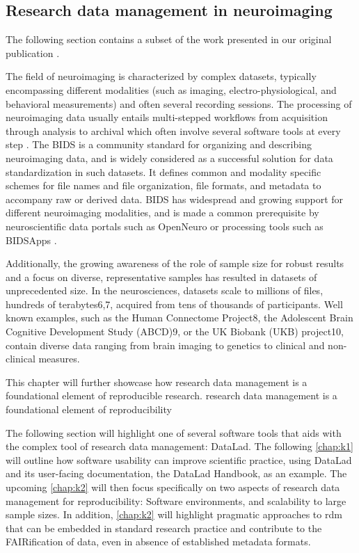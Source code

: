 \subsection{Research data management in neuroimaging}
\label{chap:k1-rdm-2}

The following section contains a subset of the work presented in our original publication \citet{NISO2022119623}.

The field of neuroimaging is characterized by complex datasets, typically encompassing different modalities (such as imaging, electro-physiological, and behavioral measurements) and often several recording sessions.
The processing of neuroimaging data usually entails multi-stepped workflows from acquisition through analysis to archival which often involve several software tools at every step \citep{poline2011}.
The \gls{BIDS} \citep{gorgolewski2016brain} is a community standard for organizing and describing neuroimaging data, and is widely considered as a successful solution for data standardization in such datasets.
It defines common and modality specific schemes for file names and file organization, file formats, and metadata to accompany raw or derived data.
\gls{BIDS} has widespread and growing support for different neuroimaging modalities, and is made a common prerequisite by neuroscientific data portals such as OpenNeuro \citep{markiewicz2021openneuro} or processing tools such as BIDSApps \citep{gorgolewski2017bids}.



Additionally, the growing awareness of the role of sample size for robust results \citep{button2013power} \citep{turner2018small} and a focus on diverse, representative samples has resulted in datasets of unprecedented size.
In the neurosciences, datasets scale to millions of files, hundreds of terabytes6,7, acquired from tens of thousands of participants. Well known examples, such as the Human Connectome Project8, the Adolescent Brain Cognitive Development Study (ABCD)9, or the UK Biobank (UKB) project10, contain diverse data ranging from brain imaging to genetics to clinical and non-clinical measures.

This chapter will further showcase how research data management is a foundational element of reproducible research.
research data management is a foundational element of reproducibility \citep{borghi2021promoting}


The following section will  highlight one of several software tools that aids with the complex tool of research data management: DataLad. The following \cref{chap:k1} will outline how software usability can improve scientific practice, using DataLad and its user-facing documentation, the DataLad Handbook, as an example.
The upcoming \cref{chap:k2} will then focus specifically on two aspects of research data management for reproducibility: Software environments, and scalability to large sample sizes.
In addition, \cref{chap:k2} will highlight pragmatic approaches to \gls{rdm} that can be embedded in standard research practice and contribute to the FAIRification of data, even in absence of established metadata formats.


